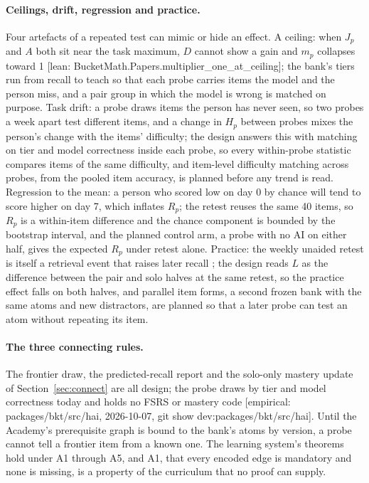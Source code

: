 \documentclass[11pt]{article}
\newcommand{\emp}[1]{\textcolor{bucketgray}{\footnotesize [empirical: #1]}}
\newcommand{\hai}{\emp{packages/bkt/src/hai, 2026-10-07, git show dev:packages/bkt/src/hai}}
\newcommand{\bm}[1]{\textcolor{bucketgray}{\footnotesize [lean: #1]}}
\begin{document}
\paragraph{Ceilings, drift, regression and practice.}
Four artefacts of a repeated test can mimic or hide an effect. A ceiling: when $J_p$ and $A$ both sit near the task maximum, $D$ cannot show a gain and $m_p$ collapses toward 1 \bm{BucketMath.Papers.multiplier\_one\_at\_ceiling}; the bank's tiers run from recall to teach so that each probe carries items the model and the person miss, and a pair group in which the model is wrong is matched on purpose. Task drift: a probe draws items the person has never seen, so two probes a week apart test different items, and a change in $H_p$ between probes mixes the person's change with the items' difficulty; the design answers this with matching on tier and model correctness inside each probe, so every within-probe statistic compares items of the same difficulty, and item-level difficulty matching across probes, from the pooled item accuracy, is planned before any trend is read. Regression to the mean: a person who scored low on day 0 by chance will tend to score higher on day 7, which inflates $R_p$; the retest reuses the same 40 items, so $R_p$ is a within-item difference and the chance component is bounded by the bootstrap interval, and the planned control arm, a probe with no AI on either half, gives the expected $R_p$ under retest alone. Practice: the weekly unaided retest is itself a retrieval event that raises later recall \autocite{roediger2006testing}; the design reads $L$ as the difference between the pair and solo halves at the same retest, so the practice effect falls on both halves, and parallel item forms, a second frozen bank with the same atoms and new distractors, are planned so that a later probe can test an atom without repeating its item.

\paragraph{The three connecting rules.}
The frontier draw, the predicted-recall report and the solo-only mastery update of Section~\ref{sec:connect} are all design; the probe draws by tier and model correctness today and holds no FSRS or mastery code \hai. Until the Academy's prerequisite graph is bound to the bank's atoms by version, a probe cannot tell a frontier item from a known one. The learning system's theorems hold under A1 through A5, and A1, that every encoded edge is mandatory and none is missing, is a property of the curriculum that no proof can supply.
\end{document}
